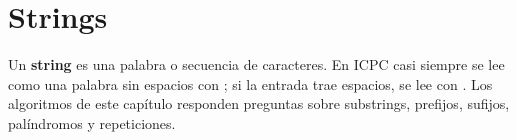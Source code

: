 \section{Strings}\label{sec:strings}

Un \textbf{string} es una palabra o secuencia de caracteres. En ICPC casi
siempre se lee como una palabra sin espacios con ; si la
entrada trae espacios, se lee con . Los algoritmos de este
capítulo responden preguntas sobre substrings, prefijos, sufijos,
palíndromos y repeticiones.







